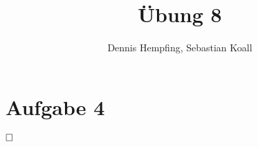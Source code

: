 \documentclass[12pt]{scrartcl}%
\theoremstyle{nonumberplain}
\begin{document}
\author{Dennis Hempfing, Sebastian Koall}
\title{Übung 8}
\date{} 
\pagestyle{myheadings}

\maketitle %

\section*{Aufgabe 4}

$\hfill \square$ 
\end{document}
